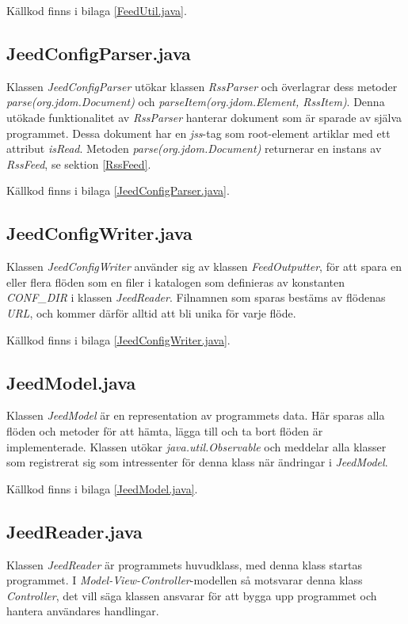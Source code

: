 \documentclass[a4paper, 12pt]{article}
\begin{document}
Källkod finns i bilaga \ref{FeedUtil.java}.

\subsection{JeedConfigParser.java}\label{JeedConfigParser}
Klassen \textit{JeedConfigParser} utökar klassen \textit{RssParser}
och överlagrar dess metoder \textit{parse(org.jdom.Document)} och
\textit{parseItem(org.jdom.Element, RssItem)}. Denna utökade
funktionalitet av \textit{RssParser} hanterar dokument som är sparade
av själva programmet. Dessa dokument har en \textit{jss}-tag som root-element
artiklar med ett attribut \textit{isRead}. Metoden
\textit{parse(org.jdom.Document)} returnerar en instans av
\textit{RssFeed}, se sektion \ref{RssFeed}.

Källkod finns i bilaga \ref{JeedConfigParser.java}.

\subsection{JeedConfigWriter.java}\label{JeedConfigWriter}
Klassen \textit{JeedConfigWriter} använder sig av klassen
\textit{FeedOutputter}, för att spara en eller flera flöden som en
filer i katalogen som definieras av konstanten \textit{CONF\_DIR} i
klassen \textit{JeedReader}. Filnamnen som sparas bestäms av flödenas
\textit{URL}, och kommer därför alltid att bli unika för varje flöde.

Källkod finns i bilaga \ref{JeedConfigWriter.java}.

\subsection{JeedModel.java}\label{JeedModel}
Klassen \textit{JeedModel} är en representation av programmets
data. Här sparas alla flöden och metoder för att hämta, lägga till och
ta bort flöden är implementerade. Klassen utökar
\textit{java.util.Observable} och meddelar alla klasser som
registrerat sig som intressenter för denna klass när ändringar i
\textit{JeedModel}.

Källkod finns i bilaga \ref{JeedModel.java}.

\subsection{JeedReader.java}\label{JeedReader}
Klassen \textit{JeedReader} är programmets huvudklass, med denna klass
startas programmet. I \textit{Model-View-Controller}-modellen så
motsvarar denna klass \textit{Controller}, det vill säga klassen
ansvarar för att bygga upp programmet och hantera användares
handlingar.
\end{document}
